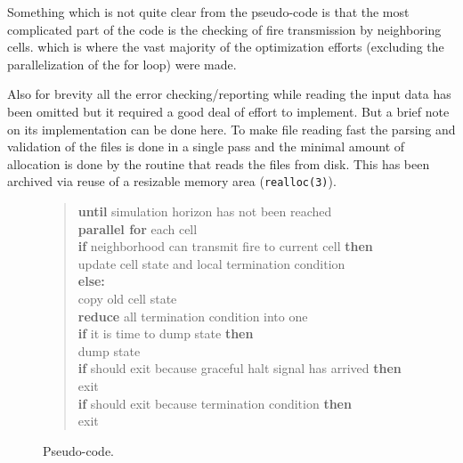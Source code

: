 \documentclass[Lau]{sapthesis} %
\begin{document}
Something which is not quite clear from the pseudo-code is that the most
complicated part of the code is the checking of fire transmission by neighboring
cells. which is where the vast majority of the optimization efforts (excluding
the parallelization of the for loop) were made.

Also for brevity all the error checking/reporting while reading the input data
has been omitted but it required a good deal of effort to implement. But a brief
note on its implementation can be done here. To make file reading fast the
parsing and validation of the files is done in a single pass and the minimal
amount of allocation is done by the routine that reads the files from disk. This
has been archived via reuse of a resizable memory area (\texttt{realloc(3)}).

\begin{figure}
\centering
\begin{verse}
\textbf{until} simulation horizon has not been reached\\
\hspace{2em} \textbf{parallel for} each cell\\
\hspace{2em}\hspace{2em} \textbf{if} neighborhood can transmit fire to current cell \textbf{then}\\
\hspace{2em}\hspace{2em}\hspace{2em} update cell state and local termination condition\\
\hspace{2em}\hspace{2em} \textbf{else:}\\
\hspace{2em}\hspace{2em}\hspace{2em} copy old cell state\\
\hspace{2em} \textbf{reduce} all termination condition into one\\
\hspace{2em} \textbf{if} it is time to dump state \textbf{then}\\
\hspace{2em}\hspace{2em} dump state\\
\hspace{2em} \textbf{if} should exit because graceful halt signal has arrived \textbf{then}\\
\hspace{2em}\hspace{2em} exit\\
\hspace{2em} \textbf{if} should exit because termination condition \textbf{then}\\
\hspace{2em}\hspace{2em} exit
\end{verse}
\caption{Pseudo-code.}
\label{fig:code}
\end{figure}
\end{document}
